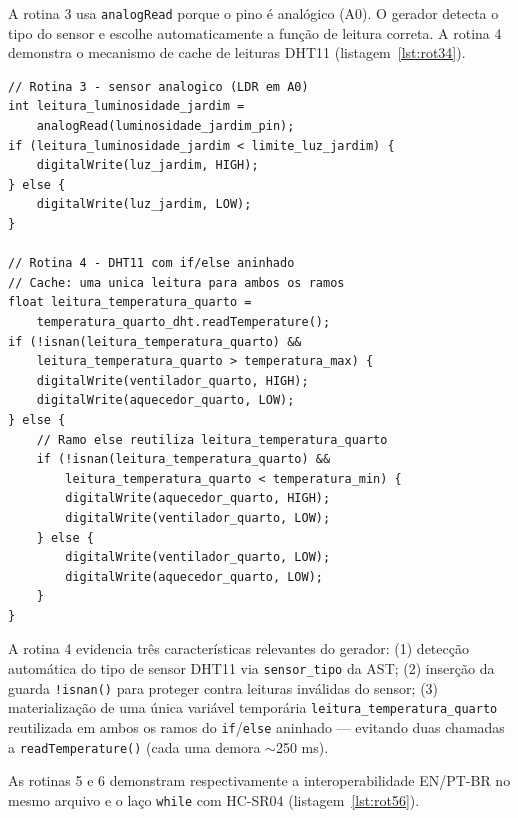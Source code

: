 \documentclass[conference]{IEEEtran}
\begin{document}
A rotina 3 usa \texttt{analogRead} porque o pino é analógico (A0). O
gerador detecta o tipo do sensor e escolhe automaticamente a função de
leitura correta. A rotina 4 demonstra o mecanismo de cache de leituras DHT11
(listagem~\ref{lst:rot34}).

\begin{lstlisting}[style=csmall,caption={Rotinas 3 e 4 — analógico e DHT11 com cache.},label={lst:rot34}]
// Rotina 3 - sensor analogico (LDR em A0)
int leitura_luminosidade_jardim =
    analogRead(luminosidade_jardim_pin);
if (leitura_luminosidade_jardim < limite_luz_jardim) {
    digitalWrite(luz_jardim, HIGH);
} else {
    digitalWrite(luz_jardim, LOW);
}

// Rotina 4 - DHT11 com if/else aninhado
// Cache: uma unica leitura para ambos os ramos
float leitura_temperatura_quarto =
    temperatura_quarto_dht.readTemperature();
if (!isnan(leitura_temperatura_quarto) &&
    leitura_temperatura_quarto > temperatura_max) {
    digitalWrite(ventilador_quarto, HIGH);
    digitalWrite(aquecedor_quarto, LOW);
} else {
    // Ramo else reutiliza leitura_temperatura_quarto
    if (!isnan(leitura_temperatura_quarto) &&
        leitura_temperatura_quarto < temperatura_min) {
        digitalWrite(aquecedor_quarto, HIGH);
        digitalWrite(ventilador_quarto, LOW);
    } else {
        digitalWrite(ventilador_quarto, LOW);
        digitalWrite(aquecedor_quarto, LOW);
    }
}
\end{lstlisting}

A rotina 4 evidencia três características relevantes do gerador: (1) detecção
automática do tipo de sensor DHT11 via \texttt{sensor\_tipo} da AST; (2)
inserção da guarda \texttt{!isnan()} para proteger contra leituras inválidas
do sensor; (3) materialização de uma única variável temporária
\texttt{leitura\_temperatura\_quarto} reutilizada em ambos os ramos do
\texttt{if}/\texttt{else} aninhado — evitando duas chamadas a
\texttt{readTemperature()} (cada uma demora $\sim$250 ms).

As rotinas 5 e 6 demonstram respectivamente a interoperabilidade EN/PT-BR
no mesmo arquivo e o laço \texttt{while} com HC-SR04
(listagem~\ref{lst:rot56}).
\end{document}
